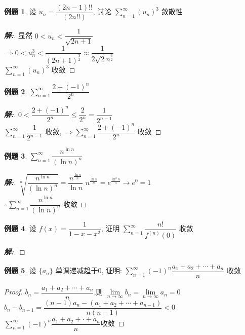 \documentclass[12pt,a4paper]{ctexart}
\newenvironment{solution}{\begin{proof}[\hspace{2em}\textbf{解:}]}{\end{proof}}
\theoremstyle{definition}%
\newtheorem{exercise}{\hspace{2em}例题}
\begin{document}
\begin{exercise}
	设 $ u_n=\dfrac{(2n-1)!!}{(2n!!)} $, 讨论 $ \displaystyle\sum_{n=1}^{\infty}(u_n)^3 $ 敛散性
\end{exercise}
\begin{solution}
	显然 $ 0 < u_n < \dfrac{1}{\sqrt{2n+1}} $\\
	
	$ \Rightarrow 0 < u_n^3 < \dfrac{1}{(2n+1)^{\frac{3}{2}}}
	\approx \dfrac{1}{2\sqrt{2}n^{\frac{3}{2}}} $\\
	
	$ \displaystyle\sum_{n=1}^{\infty}(u_n)^3 $ 收敛
\end{solution}

\begin{exercise}
	$ \displaystyle\sum_{n=1}^{\infty}\dfrac{2+(-1)^n}{2^n} $
\end{exercise}
\begin{solution}
	$ 0 < \dfrac{2+(-1)^n}{2^n} \le \dfrac{2}{2^n} = \dfrac{1}{2^{n-1}} $\\
	
	$ \displaystyle\sum_{n=1}^{\infty}\dfrac{1}{2^{n-1}} $ 收敛,
	$ \Rightarrow \displaystyle\sum_{n=1}^{\infty}\dfrac{2+(-1)^n}{2^n} $ 收敛
\end{solution}

\begin{exercise}
	$ \displaystyle\sum_{n=1}^{\infty}\dfrac{n^{\ln n}}{(\ln n)^n} $
\end{exercise}
\begin{solution}
	$ \sqrt[n]{\dfrac{n^{\ln n}}{(\ln n)^n}}=\dfrac{n^{\frac{\ln n}{n}}}{\ln n} $
	$ n^{\frac{\ln n}{n}}=e^{\tfrac{\ln^2 n}{n}} \to e^0=1$\\
	
	$ \therefore\displaystyle\sum_{n=1}^{\infty}\dfrac{n^{\ln n}}{(\ln n)^n} $ 收敛
\end{solution}

\begin{exercise}
	设 $ f(x)=\dfrac{1}{1-x-x^2} $, 证明 $ \displaystyle\sum_{n=1}^{\infty}\dfrac{n!}{f^{(n)}(0)} $ 收敛
\end{exercise}
\begin{solution}
	
\end{solution}

\begin{exercise}
	设 $ \{a_n\} $ 单调递减趋于0, 证明: $ \displaystyle\sum_{n=1}^{\infty} (-1)^n \dfrac{a_1+a_2+\cdots+a_n}{n} $ 收敛
\end{exercise}
\begin{proof}
	$ b_n=\dfrac{a_1+a_2+\cdots+a_n}{n} $,则 $ \lim\limits_{n \to \infty}b_n=\lim\limits_{n \to \infty}a_n=0 $\\
	
	$ b_n-b_{n-1}=\dfrac{(n-1)a_n-(a_1+a_2+\cdots+a_{n-1})}{n(n-1)}<0 $\\
	
	$ \displaystyle\sum_{n=1}^{\infty}(-1)^n\dfrac{a_1+a_2+\cdot+a_n}{n} $收敛
\end{proof}
\end{document}
